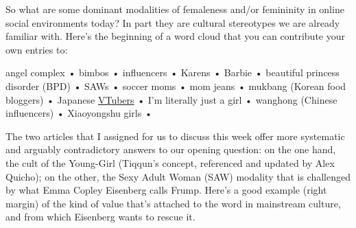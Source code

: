 \documentclass[
  letterpaper,
  DIV=11,
  numbers=noendperiod,
  oneside]{scrartcl}
\begin{document}
So what are some dominant modalities of femaleness and/or femininity in
online social environments today? In part they are cultural stereotypes
we are already familiar with. Here's the beginning of a word cloud that
you can contribute your own entries to:

angel complex • bimbos • influencers • Karens • Barbie • beautiful
princess disorder (BPD) • SAWs • soccer moms • mom jeans • mukbang
(Korean food bloggers) • Japanese
\href{https://restofworld.org/2021/vtubers/}{VTubers} • I'm literally
just a girl • wanghong (Chinese influencers) • Xiaoyongshu girls •

The two articles that I assigned for us to discuss this week offer more
systematic and arguably contradictory answers to our opening question:
on the one hand, the cult of the Young-Girl (Tiqqun's concept,
referenced and updated by Alex Quicho); on the other, the Sexy Adult
Woman (SAW) modality that is challenged by what Emma Copley Eisenberg
calls Frump. Here's a good example (right margin) of the kind of value
that's attached to the word in mainstream culture, and from which
Eisenberg wants to rescue it.
\end{document}
